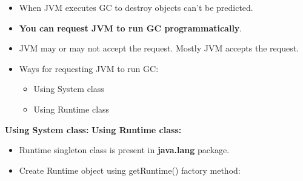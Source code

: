 \setlength{\columnsep}{3pt}
\begin{flushleft}
	
	\begin{itemize}
		\item When JVM executes GC to destroy objects can't be predicted.
		\item \textbf{You can request JVM to run GC programmatically}.
		\item JVM may or may not accept the request. Mostly JVM accepts the request.
		\item  Ways for requesting JVM to run GC:
		\begin{itemize}
			\item Using System class
			\item Using Runtime class
		\end{itemize}
	\end{itemize}

		\textbf{Using System class:}
		\newpage
		\textbf{Using Runtime class:}
			\begin{itemize}
				\item Runtime singleton class is present in \textbf{java.lang} package.
				\item Create Runtime object using getRuntime() factory method:
				

\end{itemize}
\end{flushleft}
